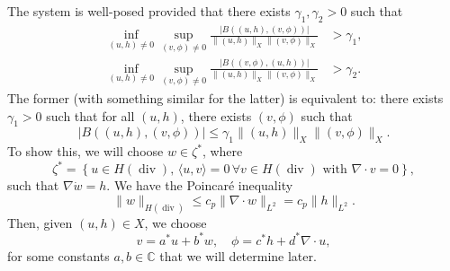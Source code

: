 \documentclass{article}
\DeclareMathOperator{\DIV}{div}
\begin{document}
The system is well-posed provided that there exists $\gamma_1,\gamma_2>0$ such
that
\begin{align}
  \inf_{(u,h)\neq 0}\sup_{(v,\phi)\neq 0}
  \frac{|B((u,h), (v,\phi))|}{\|(u,h)\|_X\|(v,\phi)\|_X} &> \gamma_1, \\
  \inf_{(u,h)\neq 0}\sup_{(v,\phi)\neq 0}
  \frac{|B((v,\phi), (u,h))|}{\|(u,h)\|_X\|(v,\phi)\|_X} &> \gamma_2.
\end{align}
The former (with something similar for the latter) is equivalent to:
there exists $\gamma_1>0$ such that for all $(u,h)$, there exists
$(v,\phi)$ such that
\begin{equation}
  |B((u,h), (v,\phi))| \leq \gamma_1\|(u,h)\|_X\|(v,\phi)\|_X.
\end{equation}
To show this, we will choose $w \in \zeta^*$,
where
\begin{equation}
  \zeta^* = \left\{u \in H(\DIV), \, \langle u, v\rangle = 0 \, \forall
    v \in H(\DIV) \mbox{ with } \nabla\cdot v=0\right\},
\end{equation}
such that $\nabla\dot w = h$. We have the
Poincar\'e inequality
\begin{equation}
  \|w\|_{H(\DIV)} \leq c_p\|\nabla\cdot w\|_{L^2}
  = c_p\|h\|_{L^2}.
\end{equation}
Then, given $(u,h)\in X$, we choose
\begin{equation}
v = a^*u + b^*w, \quad \phi = c^*h + d^*\nabla\cdot u,
\end{equation}
for some constants
$a,b\in \mathbb{C}$ that we will determine later.
\end{document}
